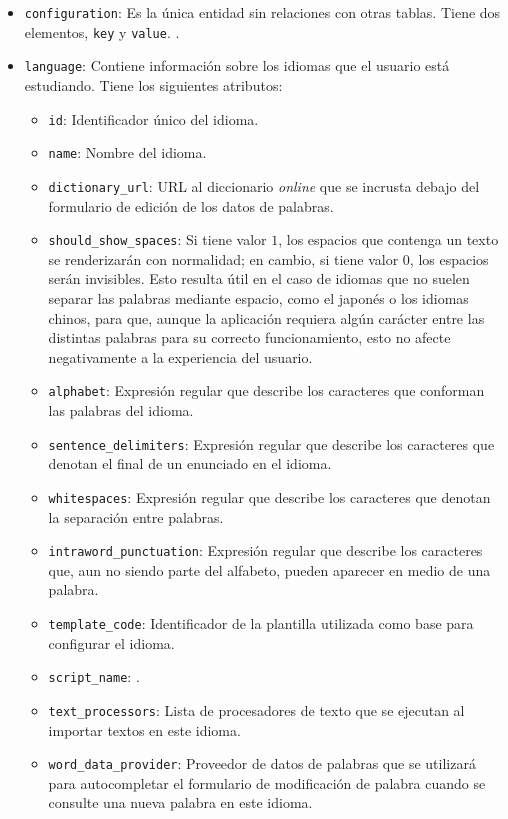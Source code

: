 \begin{itemize}
	\item \texttt{configuration}: Es la única entidad sin relaciones con otras tablas. Tiene dos elementos, \texttt{key} y \texttt{value}. .
	\item \texttt{language}: Contiene información sobre los idiomas que el usuario está estudiando. Tiene los siguientes atributos:
		\begin{itemize}[label=$\star$]
			\item \texttt{id}: Identificador único del idioma.
			\item \texttt{name}: Nombre del idioma.
			\item \texttt{dictionary\_url}: URL al diccionario \textit{online} que se incrusta debajo del formulario de edición de los datos de palabras.
			\item \texttt{should\_show\_spaces}: Si tiene valor $1$, los espacios que contenga un texto se renderizarán con normalidad; en cambio, si tiene valor $0$, los espacios serán invisibles. Esto resulta útil en el caso de idiomas que no suelen separar las palabras mediante espacio, como el japonés o los idiomas chinos, para que, aunque la aplicación requiera algún carácter entre las distintas palabras para su correcto funcionamiento, esto no afecte negativamente a la experiencia del usuario.
			\item \texttt{alphabet}: Expresión regular que describe los caracteres que conforman las palabras del idioma.
			\item \texttt{sentence\_delimiters}: Expresión regular que describe los caracteres que denotan el final de un enunciado en el idioma.
			\item \texttt{whitespaces}: Expresión regular que describe los caracteres que denotan la separación entre palabras.
			\item \texttt{intraword\_punctuation}: Expresión regular que describe los caracteres que, aun no siendo parte del alfabeto, pueden aparecer en medio de una palabra.
			\item \texttt{template\_code}: Identificador de la plantilla utilizada como base para configurar el idioma.
			\item \texttt{script\_name}: \todo.
			\item \texttt{text\_processors}: Lista de procesadores de texto que se ejecutan al importar textos en este idioma.
			\item \texttt{word\_data\_provider}: Proveedor de datos de palabras que se utilizará para autocompletar el formulario de modificación de palabra cuando se consulte una nueva palabra en este idioma.

\end{itemize}
\end{itemize}
